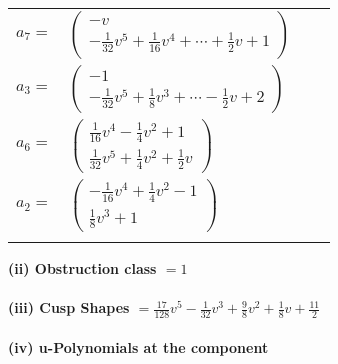 \documentclass[1p]{elsarticle_modified}
\theoremstyle{definition}
\begin{document}
\begin{tabular}{m{7pt} m{180pt} m{7pt} m{180pt} }
\flushright $a_{7}=$&$\begin{pmatrix}- v\\-\frac{1}{32} v^5+\frac{1}{16} v^4+\cdots+\frac{1}{2} v+1\end{pmatrix}$ \\
\flushright $a_{3}=$&$\begin{pmatrix}-1\\-\frac{1}{32} v^5+\frac{1}{8} v^3+\cdots-\frac{1}{2} v+2\end{pmatrix}$ \\
\flushright $a_{6}=$&$\begin{pmatrix}\frac{1}{16} v^4-\frac{1}{4} v^2+1\\\frac{1}{32} v^5+\frac{1}{4} v^2+\frac{1}{2} v\end{pmatrix}$ \\
\flushright $a_{2}=$&$\begin{pmatrix}-\frac{1}{16} v^4+\frac{1}{4} v^2-1\\\frac{1}{8} v^3+1\end{pmatrix}$\\&\end{tabular}
\flushleft \textbf{(ii) Obstruction class $= 1$}\\~\\
\flushleft \textbf{(iii) Cusp Shapes $= \frac{17}{128} v^5-\frac{1}{32} v^3+\frac{9}{8} v^2+\frac{1}{8} v+\frac{11}{2}$}\\~\\
\newpage\renewcommand{\arraystretch}{1}
\flushleft \textbf{(iv) u-Polynomials at the component}\newline \\
\end{document}
